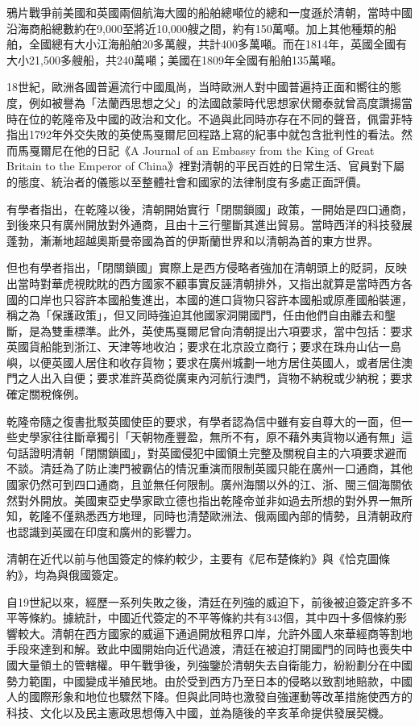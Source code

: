 鴉片戰爭前美國和英國兩個航海大國的船舶總噸位的總和一度遜於清朝，當時中國沿海商船總數約在9,000至將近10,000艘之間，約有150萬噸。加上其他種類的船舶，全國總有大小江海船舶20多萬艘，共計400多萬噸。而在1814年，英國全國有大小21,500多艘船，共240萬噸；美國在1809年全國有船舶135萬噸。

18世紀，歐洲各國普遍流行中國風尚，当時歐洲人對中國普遍持正面和嚮往的態度，例如被譽為「法蘭西思想之父」的法國啟蒙時代思想家伏爾泰就曾高度讚揚當時在位的乾隆帝及中國的政治和文化。不過與此同時亦存在不同的聲音，佩雷菲特指出1792年外交失敗的英使馬戛爾尼回程路上寫的紀事中就包含批判性的看法。然而馬戛爾尼在他的日記《A Journal of an Embassy from the King of Great Britain to the Emperor of China》裡對清朝的平民百姓的日常生活、官員對下屬的態度、統治者的儀態以至整體社會和國家的法律制度有多處正面評價。

有學者指出，在乾隆以後，清朝開始實行「閉關鎖國」政策，一開始是四口通商，到後來只有廣州開放對外通商，且由十三行壟斷其進出貿易。當時西洋的科技發展蓬勃，漸漸地超越奧斯曼帝國為首的伊斯蘭世界和以清朝為首的東方世界。

但也有學者指出，「閉關鎖國」實際上是西方侵略者強加在清朝頭上的貶詞，反映出當時對華虎視眈眈的西方國家不顧事實反誣清朝排外，又指出就算是當時西方各國的口岸也只容許本國船隻進出，本國的進口貨物只容許本國船或原產國船裝運，稱之為「保護政策」，但又同時強迫其他國家洞開國門，任由他們自由離去和壟斷，是為雙重標準。此外，英使馬戛爾尼曾向清朝提出六項要求，當中包括：要求英國貨船能到浙江、天津等地收泊；要求在北京設立商行；要求在珠舟山佔一島嶼，以便英國人居住和收存貨物；要求在廣州城劃一地方居住英國人，或者居住澳門之人出入自便；要求准許英商從廣東內河航行澳門，貨物不納稅或少納稅；要求確定關稅條例。

乾隆帝隨之復書批駁英國使臣的要求，有學者認為信中雖有妄自尊大的一面，但一些史學家往往斷章獨引「天朝物產豐盈，無所不有，原不藉外夷貨物以通有無」這句話證明清朝「閉關鎖國」，對英國侵犯中國領土完整及關稅自主的六項要求避而不談。清廷為了防止澳門被霸佔的情況重演而限制英國只能在廣州一口通商，其他國家仍然可到四口通商，且並無任何限制。廣州海關以外的江、浙、閩三個海關依然對外開放。美國東亞史學家歐立德也指出乾隆帝並非如過去所想的對外界一無所知，乾隆不僅熟悉西方地理，同時也清楚歐洲法、俄兩國內部的情勢，且清朝政府也認識到英國在印度和廣州的影響力。

清朝在近代以前与他国簽定的條約較少，主要有《尼布楚條約》與《恰克圖條約》，均為與俄國簽定。

自19世紀以來，經歷一系列失敗之後，清廷在列強的威迫下，前後被迫簽定許多不平等條約。據統計，中國近代簽定的不平等條約共有343個，其中四十多個條約影響較大。清朝在西方國家的威逼下通過開放租界口岸，允許外國人來華經商等割地手段來達到和解。致此中國開始向近代過渡，清廷在被迫打開國門的同時也喪失中國大量領土的管轄權。甲午戰爭後，列強鑒於清朝失去自衛能力，紛紛劃分在中國勢力範圍，中國變成半殖民地。由於受到西方乃至日本的侵略以致割地賠款，中國人的國際形象和地位也驟然下降。但與此同時也激發自強運動等改革措施使西方的科技、文化以及民主憲政思想傳入中國，並為隨後的辛亥革命提供發展契機。

